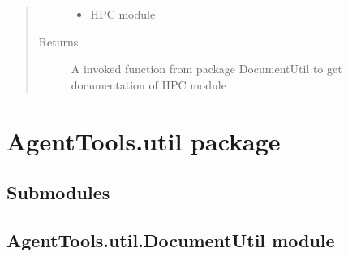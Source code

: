 \documentclass[letterpaper,10pt,english]{sphinxmanual}
\begin{document}
\begin{fulllineitems}
\begin{fulllineitems}
\begin{quote}
\begin{description}
\begin{itemize}
\item {} 
 \textendash{} HPC module

\end{itemize}

\item[{Returns}] \leavevmode
A invoked function from package DocumentUtil to get documentation of HPC module

\end{description}\end{quote}

\end{fulllineitems}


\end{fulllineitems}



\section{AgentTools.util package}
\label{\detokenize{AgentTools.util:agenttools-util-package}}\label{\detokenize{AgentTools.util::doc}}

\subsection{Submodules}
\label{\detokenize{AgentTools.util:submodules}}

\subsection{AgentTools.util.DocumentUtil module}
\label{\detokenize{AgentTools.util:module-AgentTools.util.DocumentUtil}}\label{\detokenize{AgentTools.util:agenttools-util-documentutil-module}}
\end{document}
